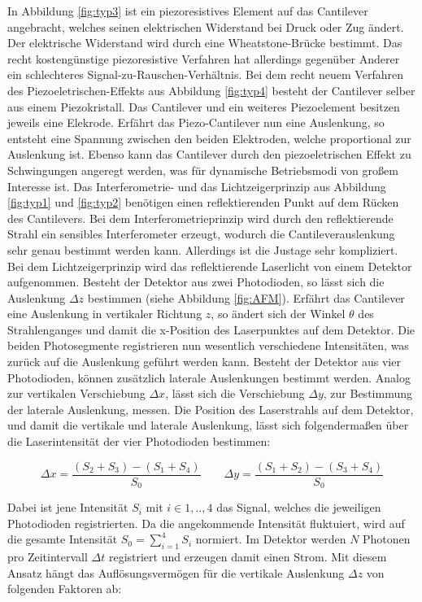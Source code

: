 \noindent
In Abbildung \ref{fig:typ3} ist ein piezoresistives Element auf das Cantilever
angebracht, welches seinen elektrischen Widerstand bei Druck oder Zug ändert.
Der elektrische Widerstand wird durch eine Wheatstone-Brücke bestimmt. Das
recht kostengünstige piezoresistive Verfahren hat allerdings gegenüber Anderer
ein schlechteres Signal-zu-Rauschen-Verhältnis.
Bei dem recht neuem Verfahren des Piezoeletrischen-Effekts aus Abbildung \ref{fig:typ4}
besteht der Cantilever selber aus einem Piezokristall. Das Cantilever und
ein weiteres Piezoelement besitzen jeweils eine Elekrode. Erfährt das Piezo-Cantilever
nun eine Auslenkung, so entsteht eine Spannung zwischen den beiden Elektroden,
welche proportional zur Auslenkung ist. Ebenso kann das Cantilever durch den
piezoeletrischen Effekt zu Schwingungen angeregt werden, was für dynamische
Betriebsmodi von großem Interesse ist.
Das Interferometrie- und das Lichtzeigerprinzip aus Abbildung \ref{fig:typ1} und
\ref{fig:typ2} benötigen einen reflektierenden Punkt auf dem Rücken des Cantilevers.
Bei dem Interferometrieprinzip wird durch den reflektierende Strahl ein sensibles
Interferometer erzeugt, wodurch die Cantileverauslenkung sehr genau bestimmt
werden kann. Allerdings ist die Justage sehr kompliziert.
Bei dem Lichtzeigerprinzip wird das reflektierende Laserlicht von einem Detektor aufgenommen.
Besteht der Detektor aus zwei Photodioden, so lässt sich die Auslenkung $\Delta z$
bestimmen (siehe Abbildung \ref{fig:AFM}). Erfährt das Cantilever eine Auslenkung
in vertikaler Richtung $z$, so ändert sich der Winkel $\theta$ des Strahlenganges
und damit die x-Position des Laserpunktes auf dem Detektor. Die beiden
Photosegmente registrieren nun wesentlich verschiedene Intensitäten, was zurück
auf die Auslenkung geführt werden kann. Besteht der Detektor aus vier Photodioden,
können zusätzlich laterale Auslenkungen bestimmt werden. Analog zur vertikalen
Verschiebung $\Delta x$, lässt sich die Verschiebung $\Delta y$, zur Bestimmung der
laterale Auslenkung, messen. Die Position des Laserstrahls auf dem Detektor, und
damit die vertikale und laterale Auslenkung, lässt sich folgendermaßen über die
Laserintensität der vier Photodioden bestimmen:

\begin{equation}
  \Delta x = \frac{(S_2 + S_3)-(S_1 + S_4)}{S_0}
  \qquad
  \Delta y = \frac{(S_1 + S_2)-(S_3 + S_4)}{S_0}
  \label{eq:F2}
\end{equation}

\noindent
Dabei ist jene Intensität $S_i$ mit $i \in {1,..,4}$ das Signal, welches die
jeweiligen Photodioden registrierten.
Da die angekommende Intensität fluktuiert, wird auf die gesamte Intensität $S_0 = \sum_{i=1}^4 S_i$
normiert. Im Detektor werden $N$ Photonen pro Zeitintervall $\Delta t$ registriert
und erzeugen damit einen Strom. Mit diesem Ansatz hängt das Auflösungsvermögen
\cite[165]{AFM} für die vertikale Auslenkung $\Delta z$ von folgenden Faktoren ab:

